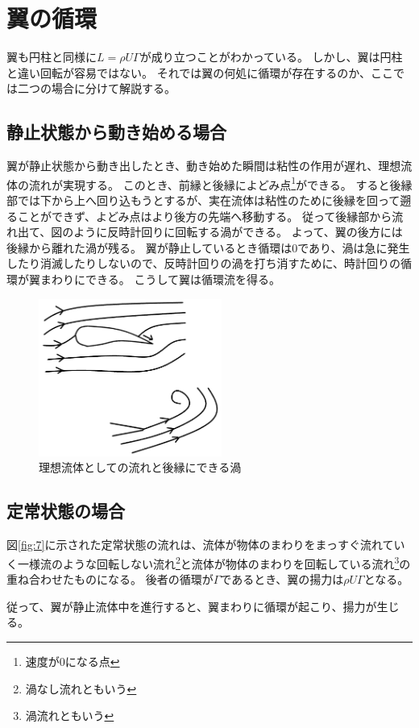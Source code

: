 \documentclass[10pt,b5paper,papersize,dvipdfmx]{jsbook}
\begin{document}
\section{翼の循環}
翼も円柱と同様に$L = \rho U\Gamma $が成り立つことがわかっている。
しかし、翼は円柱と違い回転が容易ではない。
それでは翼の何処に循環が存在するのか、ここでは二つの場合に分けて解説する。

\subsection{静止状態から動き始める場合}
翼が静止状態から動き出したとき、動き始めた瞬間は粘性の作用が遅れ、理想流体の流れが実現する。
このとき、前縁と後縁によどみ点\footnote{速度が$0$になる点}ができる。
すると後縁部では下から上へ回り込もうとするが、実在流体は粘性のために後縁を回って遡ることができず、よどみ点はより後方の先端へ移動する。
従って後縁部から流れ出て、図のように反時計回りに回転する渦ができる。
よって、翼の後方には後縁から離れた渦が残る。
翼が静止しているとき循環は$0$であり、渦は急に発生したり消滅したりしないので、反時計回りの渦を打ち消すために、時計回りの循環が翼まわりにできる。
こうして翼は循環流を得る。
\begin{figure}[ht]
  \centering
  \includegraphics[width=60mm]{img/ryuutai9.png}
  \caption{理想流体としての流れと後縁にできる渦}
\end{figure}
\subsection{定常状態の場合}
図\ref{fig:7}に示された定常状態の流れは、流体が物体のまわりをまっすぐ流れていく一様流のような回転しない流れ\footnote{渦なし流れともいう}と流体が物体のまわりを回転している流れ\footnote{渦流れともいう}の重ね合わせたものになる。
後者の循環が$\Gamma $であるとき、翼の揚力は$\rho U\Gamma$となる。
\par
従って、翼が静止流体中を進行すると、翼まわりに循環が起こり、揚力が生じる。
\end{document}

